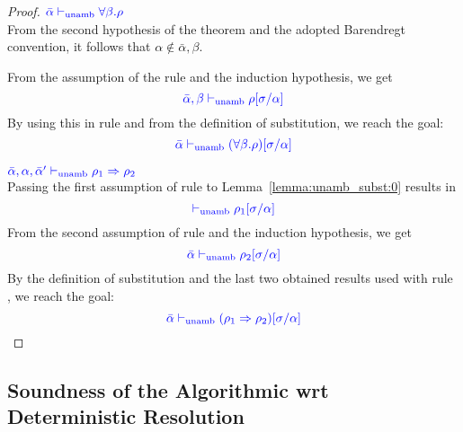 \begin{proof}
\item[\fbox{\rref{UA-TAbs}}]\quad${\color{blue} \bar{\alpha} \vdash_{\mathrm{unamb}} \forall \beta. \rho}$\\

From the second hypothesis of the theorem and the adopted Barendregt convention, it follows that $\alpha\notin\bar\alpha,\beta$.

From the assumption of the rule and the induction hypothesis, we get
\begin{equation*}
{\color{blue} \bar{\alpha},\beta \vdash_{\mathrm{unamb}}\rho[\sigma/\alpha]}
\end{equation*}
By using this in rule  and from the definition of substitution, we reach the goal:
\begin{equation*}
{\color{blue} \bar{\alpha} \vdash_{\mathrm{unamb}}(\forall \beta. \rho)[\sigma/\alpha]}
\end{equation*}

\item[\fbox{\rref{UA-IAbs}}]\quad${\color{blue} \bar{\alpha},\alpha,\bar{\alpha}' \vdash_{\mathrm{unamb}} \rho_1\Rightarrow\rho_2}$\\

Passing the first assumption of rule  to Lemma~\ref{lemma:unamb_subst:0} results in
\begin{equation*}
{\color{blue}  \vdash_{\mathrm{unamb}}\rho_1[\sigma/\alpha]}
\end{equation*}
From the second assumption of rule  and the induction hypothesis, we get
\begin{equation*}
{\color{blue} \bar{\alpha} \vdash_{\mathrm{unamb}}\rho_2[\sigma/\alpha]}
\end{equation*}
By the definition of substitution and the last two obtained results used with rule
, we reach the goal:
\begin{equation*}
{\color{blue} \bar{\alpha} \vdash_{\mathrm{unamb}}(\rho_1\Rightarrow\rho_2)[\sigma/\alpha]}
\end{equation*}
\end{proof}

\subsection{Soundness of the Algorithmic wrt Deterministic Resolution}

